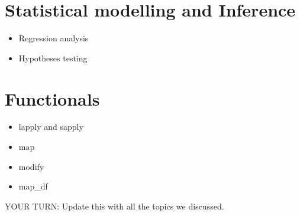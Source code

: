 \documentclass[]{article}
\begin{document}
\hypertarget{statistical-modelling-and-inference}{%
\section{Statistical modelling and
Inference}\label{statistical-modelling-and-inference}}

\begin{itemize}
\item
  Regression analysis
\item
  Hypotheses testing
\end{itemize}

\hypertarget{functionals}{%
\section{Functionals}\label{functionals}}

\begin{itemize}
\item
  lapply and sapply
\item
  map
\item
  modify
\item
  map\_df
\end{itemize}

YOUR TURN: Update this with all the topics we discussed.
\end{document}

